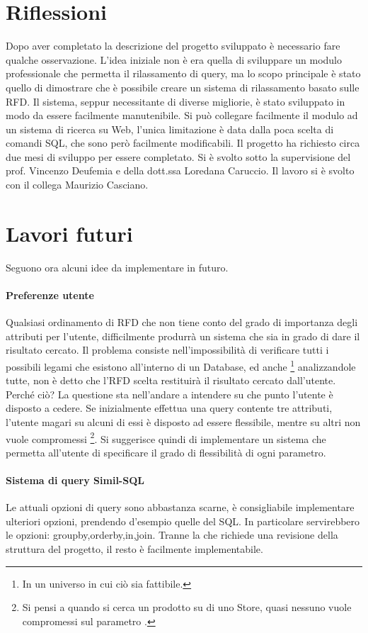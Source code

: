 \section{Riflessioni}
Dopo aver completato la descrizione del progetto sviluppato è necessario fare qualche osservazione.
L'idea iniziale non è era quella di sviluppare un modulo professionale che permetta il rilassamento di query, ma lo scopo principale è stato quello di dimostrare che è possibile creare un sistema di rilassamento basato sulle RFD.
Il sistema, seppur necessitante di diverse migliorie, è stato sviluppato in modo da essere facilmente manutenibile. 
Si può collegare facilmente il modulo ad un sistema di ricerca su Web, l'unica limitazione è data dalla poca scelta di comandi SQL, che sono però facilmente modificabili.
Il progetto ha richiesto circa due mesi di sviluppo per essere completato. Si è svolto sotto la supervisione del prof. Vincenzo Deufemia e della dott.ssa Loredana Caruccio. Il lavoro si è svolto con il collega Maurizio Casciano.

\section{Lavori futuri}
Seguono ora alcuni idee da implementare in futuro.
\paragraph{Preferenze utente}
Qualsiasi ordinamento di RFD che non tiene conto del grado di importanza degli attributi per l'utente, difficilmente produrrà un sistema che sia in grado di dare il risultato cercato.
Il problema consiste nell'impossibilità di verificare tutti i possibili legami che esistono all'interno di un Database, ed anche \footnote{In un universo in cui ciò sia fattibile.} analizzandole tutte, non è detto che l'RFD scelta restituirà il risultato cercato dall'utente. Perché ciò?
La questione sta nell'andare a intendere su che punto l'utente è disposto a cedere. Se inizialmente effettua una query contente tre attributi, l'utente magari su alcuni di essi è disposto ad essere flessibile, mentre su altri non vuole compromessi \footnote{Si pensi a quando si cerca un prodotto su di uno Store, quasi nessuno vuole compromessi sul parametro .}.
Si suggerisce quindi di implementare un sistema che permetta all'utente di specificare il grado di flessibilità di ogni parametro.
\paragraph{Sistema di query Simil-SQL}
Le attuali opzioni di query sono abbastanza scarne, è consigliabile implementare ulteriori opzioni, prendendo d'esempio quelle del SQL. In particolare servirebbero le opzioni: groupby,orderby,in,join.
Tranne la  che richiede una revisione della struttura del progetto, il resto è facilmente implementabile.
